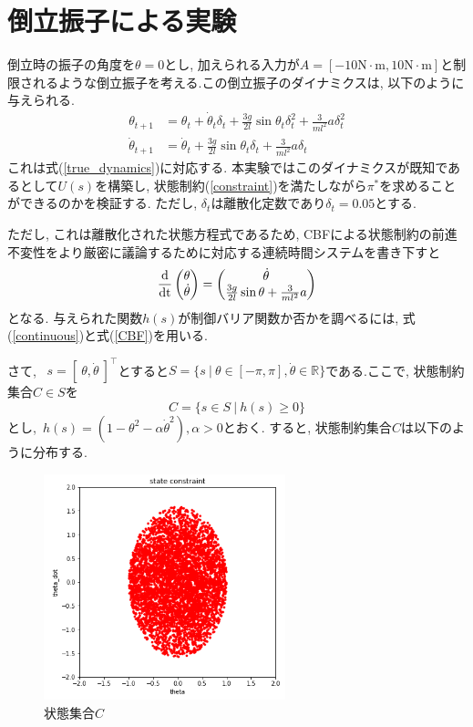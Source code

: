 \documentclass{jsarticle}
\newcommand{\odif}[2]{\frac{\rm{d}#1}{\rm{d}#2}}
\begin{document}
\section{倒立振子による実験}
倒立時の振子の角度を$\theta=0$とし, 加えられる入力が$A=[-10\textrm{N}\cdot\textrm{m},10\textrm{N}\cdot\textrm{m}]$と制限されるような倒立振子を考える.この倒立振子のダイナミクスは, 以下のように与えられる.
\begin{align}
	\theta_{t+1} &= \theta_t+\dot{\theta}_t\delta_t+\frac{3g}{2l}\sin{\theta_t}\delta_t^2+\frac{3}{ml^2}a\delta_t^2 \\
	\dot{\theta}_{t+1} &=  \dot{\theta}_t+\frac{3g}{2l}\sin{\theta_t}\delta_t+\frac{3}{ml^2}a\delta_t
\end{align}
これは式(\ref{true_dynamics})に対応する. 本実験ではこのダイナミクスが既知であるとして$U(s)$を構築し, 状態制約(\ref{constraint})を満たしながら$\pi^{*}$を求めることができるのかを検証する. ただし, $\delta_t$は離散化定数であり$\delta_t=0.05$とする.\par
ただし, これは離散化された状態方程式であるため, CBFによる状態制約の前進不変性をより厳密に議論するために対応する連続時間システムを書き下すと
\begin{equation}
	\odif{}{t}\begin{pmatrix}\theta \\ \dot{\theta}\end{pmatrix} = 
		\begin{pmatrix}\dot{\theta} \\ \frac{3g}{2l}\sin{\theta} + \frac{3}{ml^2}a \end{pmatrix} \label{continuous}
\end{equation}
となる. 与えられた関数$h(s)$が制御バリア関数か否かを調べるには, 式(\ref{continuous})と式(\ref{CBF})を用いる.\par
さて, ~$s=[~\theta, \dot{\theta}~]^{\top}$とすると$S = \{s~|~\theta\in[-\pi, \pi], \dot{\theta}\in\mathbb{R}\}$である.ここで, 状態制約集合$C\in S$を
\begin{equation}
	C=\{s\in S~|~h(s)\geq 0\}
\end{equation}とし,~$h(s)=(1-\theta^2-\alpha\dot{\theta}^2), \alpha>0$とおく. すると, 状態制約集合$C$は以下のように分布する. 
\begin{figure}[h]
	\centering
 	\includegraphics[width=7cm]{region.png}
 	\caption{状態集合$C$}
\end{figure}\\
\end{document}
